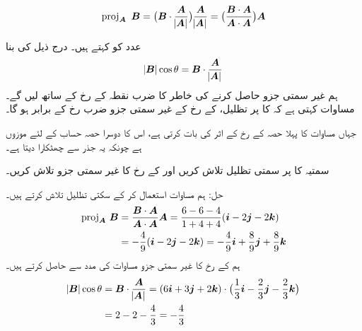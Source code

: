 \begin{align}\label{مساوات_سمتیہ_تظلیل_الف}
\operatorname{proj}_{{{\boldsymbol{A}}}}\,\,{{\boldsymbol{B}}}=\big({{\boldsymbol{B}}}\cdot\frac{{{\boldsymbol{A}}}}{\abs{{{\boldsymbol{A}}}}}\big)\frac{{{\boldsymbol{A}}}}{\abs{{{\boldsymbol{A}}}}}=\big(\frac{{{\boldsymbol{B}}}\cdot{\ensuremath{{\boldsymbol{A}}}}}{{{\boldsymbol{A}}}\cdot{\ensuremath{{\boldsymbol{A}}}}}\big){{\boldsymbol{A}}}
\end{align}

عدد  کو  کہتے ہیں۔ درج ذیل کی بنا
\begin{align}\label{مساوات_سمتیہ_غیر_سمتی_جزو}
\abs{{{\boldsymbol{B}}}}\cos\theta={{\boldsymbol{B}}}\cdot\frac{{{\boldsymbol{A}}}}{\abs{{{\boldsymbol{A}}}}}
\end{align}
ہم غیر سمتی جزو حاصل کرنے کی خاطر  کا ضرب نقطہ  کے رخ کے ساتھ لیں گے۔ مساوات  کہتی ہے کہ  کا  پر تظلیل،  کے رخ  کے غیر سمتی جزو ضرب رخ  کے برابر ہو گا۔ 

جہاں مساوات  کا پہلا حصہ  کے رخ  کے اثر کی بات کرتی ہے، اس کا دوسرا حصہ حساب کے لئے موزوں ہے چونکہ یہ جذر سے چھٹکارا دیتا ہے۔

سمتیہ  کا  پر سمتی تظلیل تلاش کریں اور  کے رخ  کا غیر سمتی جزو تلاش کریں۔

حل:\quad
ہم مساوات  استعمال کر کے سکتی تظلیل تلاش کرتے ہیں۔
\begin{align*}
\operatorname{proj}_{{{\boldsymbol{A}}}}\,{{\boldsymbol{B}}}&=\frac{{{\boldsymbol{B}}}\cdot{\ensuremath{{\boldsymbol{A}}}}}{{{\boldsymbol{A}}}\cdot{\ensuremath{{\boldsymbol{A}}}}}{{\boldsymbol{A}}}=\frac{6-6-4}{1+4+4}({\boldsymbol{i}}-2{\boldsymbol{j}}-2{\boldsymbol{k}})\\
&=-\frac{4}{9}({\boldsymbol{i}}-2{\boldsymbol{j}}-2{\boldsymbol{k}})=-\frac{4}{9}{\boldsymbol{i}}+\frac{8}{9}{\boldsymbol{j}}+\frac{8}{9}{\boldsymbol{k}}
\end{align*}
ہم  کے رخ  کا غیر سمتی جزو مساوات  کی مدد سے حاصل کرتے ہیں۔
\begin{align*}
\abs{{{\boldsymbol{B}}}}\cos\theta&={{\boldsymbol{B}}}\cdot\frac{{{\boldsymbol{A}}}}{\abs{{{\boldsymbol{A}}}}}=(6{\boldsymbol{i}}+3{\boldsymbol{j}}+2{\boldsymbol{k}})\cdot\big(\frac{1}{3}{\boldsymbol{i}}-\frac{2}{3}{\boldsymbol{j}}-\frac{2}{3}{\boldsymbol{k}}\big)\\
&=2-2-\frac{4}{3}=-\frac{4}{3}
\end{align*}

